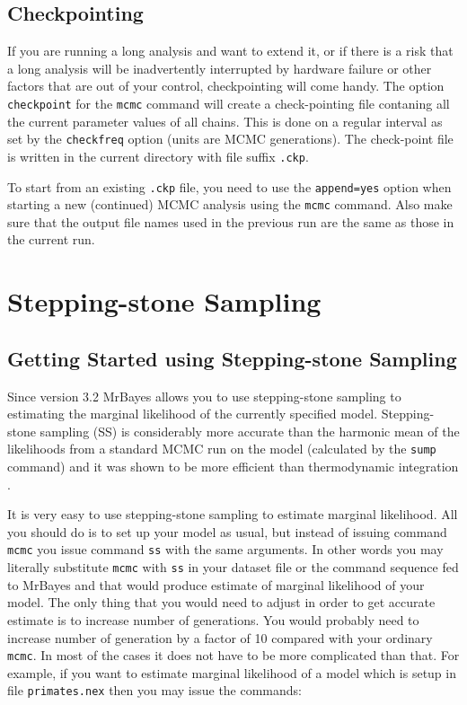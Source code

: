 \documentclass[12pt]{book}
\begin{document}
\subsection{Checkpointing}
\label{checkpointing}

If you are running a long analysis and want to extend it, or if there is a risk that a long
analysis will be inadvertently interrupted by hardware failure or other factors that are out of
your control, checkpointing will come handy. The option \texttt{checkpoint} for the \texttt{mcmc}
command will create a check-pointing file contaning all the current parameter values of all chains.
This is done on a regular interval as set by the \texttt{checkfreq} option (units are MCMC
generations).  The check-point file is written in the current directory with file suffix
\texttt{.ckp}.

To start from an existing \texttt{.ckp} file, you need to use the \texttt{append=yes} option when
starting a new (continued) MCMC analysis using the \texttt{mcmc} command. Also make sure that the
output file names used in the previous run are the same as those in the current run.

\section{Stepping-stone Sampling}

\subsection{Getting Started using Stepping-stone Sampling}

Since version 3.2 MrBayes allows you to use stepping-stone sampling \citep{xie11} to estimating the
marginal likelihood of the currently specified model. Stepping-stone sampling (SS) is considerably
more accurate than the harmonic mean of the likelihoods from a standard MCMC run on the model
(calculated by the \texttt{sump} command) and it was shown to be more efficient than thermodynamic
integration \citep{xie11}.

It is very easy to use stepping-stone sampling to estimate marginal likelihood. All you should do
is to set up your model as usual, but instead of issuing command \texttt{mcmc} you issue command
\texttt{ss} with the same arguments. In other words you may literally substitute \texttt{mcmc} with
\texttt{ss} in your dataset file or the command sequence fed to MrBayes and that would produce
estimate of marginal likelihood of your model. The only thing that you would need to adjust in
order to get accurate estimate is to increase number of generations. You would probably need to
increase number of generation by a factor of 10 compared with your ordinary \texttt{mcmc}. In most
of the cases it does not have to be more complicated than that. For example, if you want to
estimate marginal likelihood of a model which is setup in file \texttt{primates.nex} then you may
issue the commands:
\end{document}
